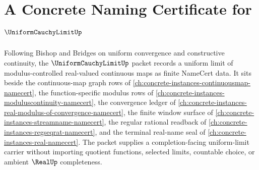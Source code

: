 \chapter{A Concrete Naming Certificate for $\UniformCauchyLimitUp$}
\label{ch:concrete-instances-uniform-cauchy-limit-namecert}

Following Bishop and Bridges on uniform convergence and constructive continuity, the $\UniformCauchyLimitUp$ packet records a uniform limit of modulus-controlled real-valued continuous maps as finite NameCert data. It sits beside the continuous-map graph rows of \autoref{ch:concrete-instances-continuousmap-namecert}, the function-specific modulus rows of \autoref{ch:concrete-instances-moduluscontinuity-namecert}, the convergence ledger of \autoref{ch:concrete-instances-real-modulus-of-convergence-namecert}, the finite window surface of \autoref{ch:concrete-instances-streamname-namecert}, the regular rational readback of \autoref{ch:concrete-instances-regseqrat-namecert}, and the terminal real-name seal of \autoref{ch:concrete-instances-real-namecert}. The packet supplies a completion-facing uniform-limit carrier without importing quotient functions, selected limits, countable choice, or ambient $\RealUp$ completeness.

